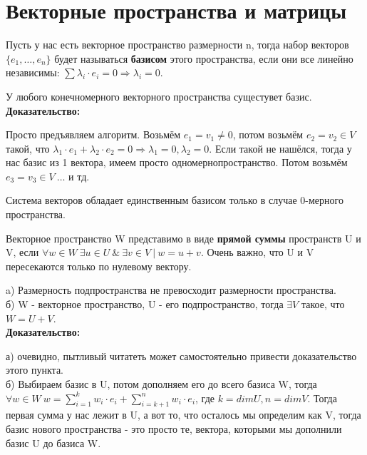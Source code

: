 \documentclass[12pt]{article}
\begin{document}
\section{Векторные пространства и матрицы}

\begin{definitionbox}
    Пусть у нас есть векторное пространство размерности n, тогда набор векторов $\{e_1, \dots, e_n\}$ будет называться \textbf{базисом} этого пространства, если они все линейно независимы: $\sum \lambda_i \cdot e_i = 0 \Rightarrow \lambda_i = 0$.
\end{definitionbox}

\begin{theorembox}
У любого конечномерного векторного пространства сущестувет базис.\\

\textbf{Доказательство:}

Просто предъявляем алгоритм. Возьмём $e_1 = v_1 \neq 0$, потом возьмём $e_2 = v_2 \in V$ такой, что $\lambda_1 \cdot e_1 + \lambda_2 \cdot e_2 = 0 \Rightarrow \lambda_1 = 0, \lambda_2 = 0$. Если такой не нашёлся, тогда у нас базис из 1 вектора, имеем просто одномернопространство. Потом возьмём $e_3 = v_3 \in V \ \dots$ и тд. 
\end{theorembox}

\begin{remarkbox}
Система векторов обладает единственным базисом только в случае 0-мерного пространства.
\end{remarkbox}

\begin{definitionbox}
    Векторное пространство W представимо в виде \textbf{прямой суммы} пространств U и V, если $\forall w \in W \ \exists u \in U \ \& \ \exists v \in V \ | \ w = u + v$. Очень важно, что U и V пересекаются только по нулевому вектору.
\end{definitionbox}

\begin{theorembox}
a) Размерность подпространства не превосходит размерности пространства.\\
б) W - векторное пространство, U - его подпространство, тогда $\exists V$ такое, что $W = U + V$.\\

\textbf{Доказательство:}

а) очевидно, пытливый читатеть может самостоятельно привести доказательство этого пункта.\\
б) Выбираем базис в U, потом дополняем его до всего базиса W, тогда $\forall w \in W \ w = \sum_{i = 1}^{k} w_i \cdot e_i + \sum_{i = k + 1}^{n} w_i \cdot e_i$, где $k = dimU, n = dimV$. Тогда первая сумма у нас лежит в U, а вот то, что осталось мы определим как V, тогда базис нового пространства - это просто те, вектора, которыми мы дополнили базис U до базиса W. 
\end{theorembox}
\end{document}
